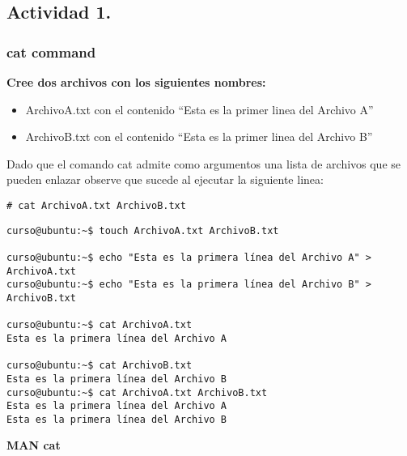 \documentclass[a4paper,11pt,spanish]{article} %
\newenvironment{myscriptlisting}
{\begin{list}{}{\setlength{\leftmargin}{1em}}\item\scriptsize\bfseries}
{\end{list}}
\begin{document}
\subsection{Actividad 1.}

\subsubsection{cat command}

\textbf{Cree dos archivos con los siguientes nombres:}\\

\begin{itemize}
 \item ArchivoA.txt con el contenido ``Esta es la primer linea del Archivo A''
 \item ArchivoB.txt con el contenido ``Esta es la primer linea del Archivo B''
\end{itemize}

Dado que el comando cat admite como argumentos una lista de archivos que se 
pueden enlazar observe que sucede al ejecutar la siguiente linea:

\begin{verbatim}
# cat ArchivoA.txt ArchivoB.txt 
\end{verbatim}

\begin{myscriptlisting}
 \begin{verbatim}
curso@ubuntu:~$ touch ArchivoA.txt ArchivoB.txt

curso@ubuntu:~$ echo "Esta es la primera línea del Archivo A" > ArchivoA.txt 
curso@ubuntu:~$ echo "Esta es la primera línea del Archivo B" > ArchivoB.txt 

curso@ubuntu:~$ cat ArchivoA.txt 
Esta es la primera línea del Archivo A

curso@ubuntu:~$ cat ArchivoB.txt 
Esta es la primera línea del Archivo B
curso@ubuntu:~$ cat ArchivoA.txt ArchivoB.txt 
Esta es la primera línea del Archivo A
Esta es la primera línea del Archivo B
  \end{verbatim}
\end{myscriptlisting}

\textbf{MAN cat}
\end{document}
